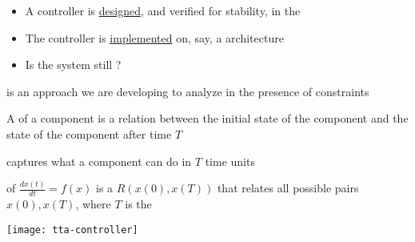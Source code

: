 \documentclass{seminar}
\begin{document}
\begin{slide}

{} 
\begin{itemize}
\item
A controller is {\underline{designed}}, and verified for stability, 
in the {}
\item
The controller is {\underline{implemented}} on, say, a
{} architecture
\item
Is the system still {}?
\end{itemize}

\bigskip
{} is an approach we are developing
to analyze {} in the presence of {} constraints

\end{slide}
\begin{slide}

{} 

\bigskip

A {} of a component
is a relation between the initial state of the component
and the state of the component after time $T$

\medskip

{} captures what a
component can do in $T$ time units

\medskip

{} of $\frac{dx(t)}{dt} = f(x)$ is a {}
$R(x(0),x(T))$ that relates all possible pairs
$x(0),x(T)$, where $T$ is the {}

\end{slide}
\begin{slide}

\begin{center}
\texttt{[image: tta-controller]}
\end{center}

\end{slide}
\end{document}
